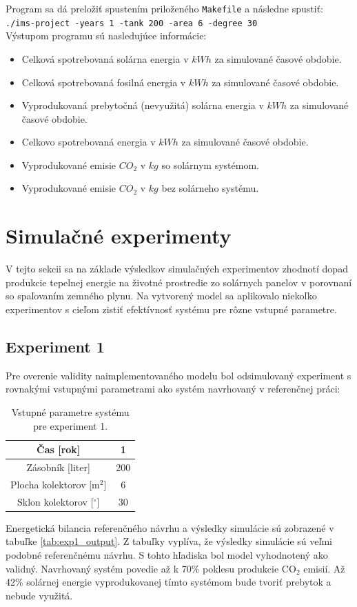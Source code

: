 \documentclass[a4paper, 11pt]{article}
\begin{document}
Program sa dá preložiť spustením priloženého \texttt{Makefile} a následne spustiť:\\
\texttt{./ims-project -years 1 -tank 200 -area 6 -degree 30} \\
Výstupom programu sú nasledujúce informácie:
\begin{itemize}
	\item Celková spotrebovaná solárna energia v $kWh$ za simulované časové obdobie.
	\item Celková spotrebovaná fosilná energia v $kWh$ za simulované časové obdobie.
	\item Vyprodukovaná prebytočná (nevyužitá) solárna energia v $kWh$ za simulované časové obdobie.
	\item Celkovo spotrebovaná energia v $kWh$ za simulované časové obdobie.
	\item Vyprodukované emisie $CO_2$ v $kg$ so solárnym systémom.
	\item Vyprodukované emisie $CO_2$ v $kg$ bez solárneho systému.
\end{itemize}

\section{Simulačné experimenty} \label{experiments}
V tejto sekcii sa na základe výsledkov simulačných experimentov zhodnotí dopad produkcie tepelnej energie na životné prostredie zo solárnych panelov v porovnaní so spaľovaním zemného plynu. Na vytvorený model sa aplikovalo niekoľko experimentov s cieľom zistiť efektívnosť systému pre rôzne vstupné parametre.

\subsection{Experiment 1} \label{experiment_1}
Pre overenie validity naimplementovaného modelu bol odsimulovaný experiment s rovnakými vstupnými parametrami ako systém navrhovaný v referenčnej práci\cite{bc_solar_system}:

\begin{table}[H]
	\centering
	\begin{tabular}{|c|c|}
		\hline
		Čas {[}rok{]} & 1 \\ \hline
		Zásobník {[}liter{]} & 200 \\ \hline
		Plocha kolektorov {[}m$^2${]} & 6 \\ \hline
		Sklon kolektorov {[}$^{\circ}${]} & 30 \\ \hline
	\end{tabular}
	\caption{Vstupné parametre systému pre experiment 1.}
	\label{tab:exp1_input}
\end{table}
Energetická bilancia referenčného návrhu\cite{bc_solar_system} a výsledky simulácie sú zobrazené v tabuľke \ref{tab:exp1_output}. Z tabuľky vyplíva, že výsledky simulácie sú veľmi podobné referenčnému návrhu. S tohto hľadiska bol model vyhodnotený ako validný. Navrhovaný systém povedie až k 70\% poklesu produkcie CO$_2$ emisií. Až 42\% solárnej energie vyprodukovanej tímto systémom bude tvoriť prebytok a nebude využitá.
\end{document}
